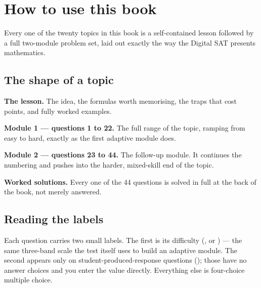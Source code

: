 \cleardoublepage
\chapter*{How to use this book}

Every one of the twenty topics in this book is a self-contained lesson
followed by a full two-module problem set, laid out exactly the way the
Digital SAT presents mathematics.

\section*{The shape of a topic}

\begin{satconcept}
\begin{list}{\textbf{\color{satteal}\textbullet}}%
  {\setlength{\leftmargin}{16pt}\setlength{\itemsep}{3pt}}
\item \textbf{The lesson.} The idea, the formulas worth memorising, the traps
      that cost points, and fully worked examples.
\item \textbf{Module 1 --- questions 1 to 22.} The full range of the topic,
      ramping from easy to hard, exactly as the first adaptive module does.
\item \textbf{Module 2 --- questions 23 to 44.} The follow-up module. It
      continues the numbering and pushes into the harder, mixed-skill end of
      the topic.
\item \textbf{Worked solutions.} Every one of the 44 questions is solved in
      full at the back of the book, not merely answered.
\end{list}
\end{satconcept}

\section*{Reading the labels}

Each question carries two small labels. The first is its difficulty
(,  or ) --- the same three-band
scale the test itself uses to build an adaptive module. The second appears
only on student-produced-response questions
(); those have no answer choices and you enter the value
directly. Everything else is four-choice multiple choice.

